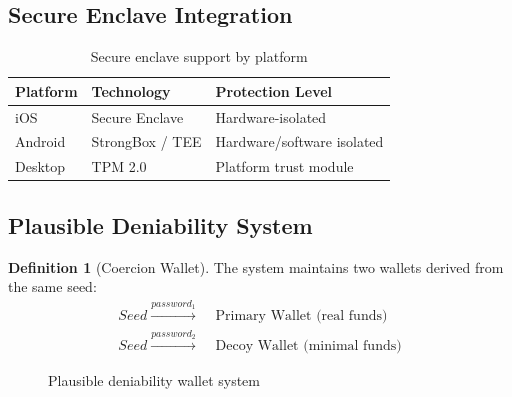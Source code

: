 \documentclass[11pt]{article}
\theoremstyle{definition}
\newtheorem{definition}{Definition}[section]
\theoremstyle{plain}
\theoremstyle{remark}
\begin{document}
\subsection{Secure Enclave Integration}

\begin{table}[H]
\centering
\caption{Secure enclave support by platform}
\label{tab:enclave}
\begin{tabular}{lll}
\toprule
\textbf{Platform} & \textbf{Technology} & \textbf{Protection Level} \\
\midrule
iOS & Secure Enclave & Hardware-isolated \\
Android & StrongBox / TEE & Hardware/software isolated \\
Desktop & TPM 2.0 & Platform trust module \\
\bottomrule
\end{tabular}
\end{table}

\subsection{Plausible Deniability System}

\begin{definition}[Coercion Wallet]
The system maintains two wallets derived from the same seed:
\begin{align}
Seed \xrightarrow{password_1} &\text{ Primary Wallet (real funds)} \\
Seed \xrightarrow{password_2} &\text{ Decoy Wallet (minimal funds)}
\end{align}
\end{definition}

\begin{figure}[H]
\centering
{}
\caption{Plausible deniability wallet system}
\label{fig:deniability}
\end{figure}
\end{document}
